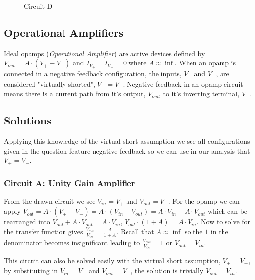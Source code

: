 \documentclass[main.tex]{subfiles}
\begin{document}
\begin{figure}[h!]
    \begin{center}
        \begin{circuitikz}[american]
            \label{fig:difference_amp}
        \end{circuitikz}
        \caption{Circuit D}
    \end{center}
\end{figure}

\spoilerline

\subsection{Operational Amplifiers}
Ideal opamps (\textit{Operational Amplifier}) are active devices defined by $V_{out} = A \cdot (V_{+} - V_{-})$ and $I_{V_{+}} = I_{V_{-}} = 0$ where $A \approx \inf$. When an opamp is connected in a negative feedback configuration, the inputs, $V_{+}$ and $V_{-}$, are considered "virtually shorted", $V_{+} = V_{-}$. Negative feedback in an opamp circuit means there is a current path from it's output, $V_{out}$, to it's inverting terminal, $V_{-}$.


\subsection{Solutions}
Applying this knowledge of the virtual short assumption we see all configurations given in the question feature negative feedback so we can use in our analysis that $V_{+} = V_{-}$. 

\subsubsection{Circuit A: Unity Gain Amplifier}
From the drawn circuit we see $V_{in} = V_{+}$ and $V_{out} = V_{-}$. For the opamp we can apply $V_{out} = A \cdot (V_{+} - V_{-}) = A \cdot (V_{in} - V_{out}) = A \cdot V_{in} - A \cdot V_{out}$ which can be rearranged into $V_{out} + A \cdot V_{out} = A \cdot V_{in}$, $V_{out} \cdot (1 + A) = A \cdot V_{in}$. Now to solve for the transfer function gives $\frac{V_{out}}{V_{in}} = \frac{A}{1+A}$. Recall that $A \approx \inf$ so the $1$ in the denominator becomes insignificant leading to $\frac{V_{out}}{V_{in}} = 1$ or $V_{out} = V_{in}$.

This circuit can also be solved easily with the virtual short assumption, $V_{+} = V_{-}$, by substituting in $V_{in} = V_{+}$ and $V_{out} = V_{-}$, the solution is trivially $V_{out} = V_{in}$.
\end{document}
